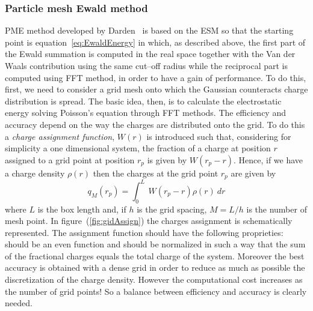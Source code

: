 \subsubsection{Particle mesh Ewald method}
\acf{PME} method developed by Darden \etal\, \cite{DardenPME} is based on the \ac{ESM} so that the starting point is equation~\eqref{eq:EwaldEnergy} in which, as described above, the first part of the Ewald summation is computed in the real space together with the Van der Waals contribution using the same cut--off radius while the reciprocal part is computed using \ac{FFT} method, in order to have a gain of performance. To do this, first, we need to consider a grid mesh onto which the Gaussian counteracts charge distribution is spread. The basic idea, then, is to calculate the electrostatic energy solving Poisson's equation through \ac{FFT} methods. The efficiency and accuracy depend on the way the charges are distributed onto the grid. To do this a \textit{charge assignment function}, $W(r)$ is introduced such that, considering for simplicity a one dimensional system, the fraction of a charge at position $r$ assigned to a grid point at position $r_p$ is given by $W(r_p - r)$. Hence, if we have a charge density $\rho(r)$ then the charges at the grid point $r_p$ are given by
\begin{equation}
	q_M(r_p) = \int_0^L\ W(r_p - r) \rho (r)\ dr
	\label{eq:meshAssign}
\end{equation}
where $L$ is the box length and, if $h$ is the grid spacing, $M = L/h$ is the number of mesh point. In figure~(\ref{fig:gidAssign}) the charges assignment is schematically represented. The assignment function should have the following proprieties: should be an even function and should be normalized in such a way that the sum of the fractional charges equals the total charge of the system. Moreover the best accuracy is obtained with a dense grid in order to reduce as much as possible the discretization of the charge density. However the computational cost increases as the number of grid points! So a balance between efficiency and accuracy is clearly needed.
